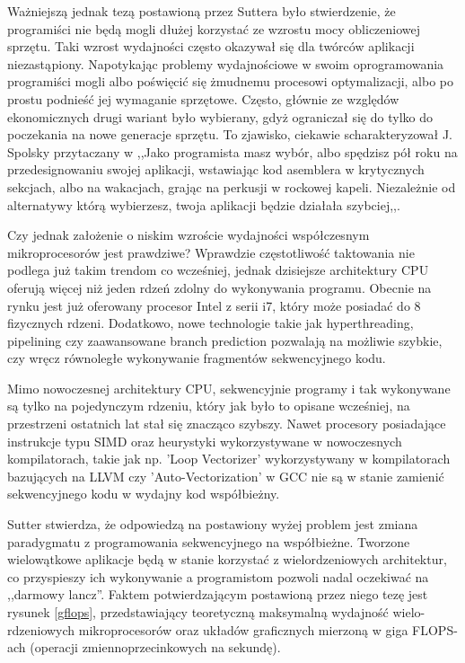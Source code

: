 Ważniejszą jednak tezą postawioną przez Suttera było stwierdzenie, że
programiści nie będą mogli dłużej korzystać ze wzrostu mocy obliczeniowej
sprzętu. Taki wzrost wydajności często okazywał się dla twórców aplikacji
niezastąpiony. Napotykając problemy wydajnościowe w swoim oprogramowania
programiści mogli albo poświęcić się żmudnemu procesowi optymalizacji, albo
po prostu podnieść jej wymaganie sprzętowe. Często, głównie ze względów
ekonomicznych drugi wariant było wybierany, gdyż ograniczał się do tylko do
poczekania na nowe generacje sprzętu. To zjawisko, ciekawie scharakteryzował J.
Spolsky przytaczany w \cite{nolunch} ,,Jako programista masz wybór, albo
spędzisz pół roku na przedesignowaniu swojej aplikacji, wstawiając kod asemblera
w krytycznych sekcjach, albo na wakacjach, grając na perkusji w rockowej kapeli.
Niezależnie od alternatywy którą wybierzesz, twoja aplikacji będzie działała
szybciej,,.

Czy jednak założenie o niskim wzroście wydajności współczesnym mikroprocesorów
jest prawdziwe? Wprawdzie częstotliwość taktowania nie podlega już takim trendom
co wcześniej, jednak dzisiejsze architektury CPU oferują więcej niż jeden rdzeń
zdolny do wykonywania programu. Obecnie na rynku jest już oferowany procesor
Intel z serii i7, który może posiadać do 8 fizycznych rdzeni. Dodatkowo, nowe
technologie takie jak hyperthreading, pipelining czy zaawansowane branch
prediction pozwalają na możliwie szybkie, czy wręcz równoległe wykonywanie
fragmentów sekwencyjnego kodu.

Mimo nowoczesnej architektury CPU, sekwencyjnie programy i tak wykonywane są
tylko na pojedynczym rdzeniu\cite{massive}, który jak było to opisane wcześniej,
na przestrzeni ostatnich lat stał się znacząco szybszy. Nawet 
procesory posiadające instrukcje typu SIMD oraz heurystyki wykorzystywane w
nowoczesnych kompilatorach, takie jak np. 'Loop Vectorizer' wykorzystywany w
kompilatorach bazujących na LLVM \cite{llvm} czy 'Auto-Vectorization' w GCC
\cite{gcc} nie są w stanie zamienić sekwencyjnego kodu w wydajny kod
współbieżny.

Sutter stwierdza, że odpowiedzą na postawiony wyżej problem jest zmiana
paradygmatu z programowania sekwencyjnego na współbieżne. Tworzone wielowątkowe
aplikacje będą w stanie korzystać z wielordzeniowych architektur, co przyspieszy
ich wykonywanie a programistom pozwoli nadal oczekiwać na ,,darmowy lancz''.
Faktem potwierdzającym postawioną przez niego tezę jest rysunek \ref{gflops},
przedstawiający teoretyczną maksymalną wydajność wielo-rdzeniowych mikroprocesorów oraz układów
graficznych mierzoną w giga FLOPS-ach (operacji zmiennoprzecinkowych na
sekundę).

